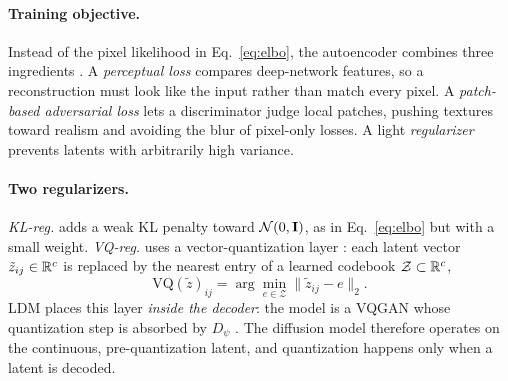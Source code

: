 \paragraph{Training objective.} Instead of the pixel likelihood in
Eq.~\eqref{eq:elbo}, the autoencoder combines three ingredients
\cite[Sec.~3.1]{rombach2022ldm}. A \emph{perceptual loss}
\cite{zhang2018lpips} compares deep-network features, so a reconstruction
must look like the input rather than match every pixel. A
\emph{patch-based adversarial loss} \cite{isola2017pix2pix,esser2021vqgan}
lets a discriminator judge local patches, pushing textures toward realism
and avoiding the blur of pixel-only losses. A light \emph{regularizer}
prevents latents with arbitrarily high variance.

\paragraph{Two regularizers.} \emph{KL-reg.} adds a weak KL penalty toward
$\mathcal{N}(0,\mathbf{I})$, as in Eq.~\eqref{eq:elbo} but with a small weight.
\emph{VQ-reg.} uses a vector-quantization layer \cite{oord2017vqvae}: each
latent vector $\tilde z_{ij}\in\mathbb{R}^c$ is replaced by the nearest entry of a
learned codebook $\mathcal Z\subset\mathbb{R}^c$,
\begin{equation}
\mathrm{VQ}(\tilde z)_{ij}=\arg\min_{e\in\mathcal Z}\|\tilde z_{ij}-e\|_2.
\label{eq:vq}
\end{equation}
LDM places this layer \emph{inside the decoder}: the model is a VQGAN
\cite{esser2021vqgan} whose quantization step is absorbed by $D_\psi$
\cite[Sec.~3.1]{rombach2022ldm}. The diffusion model therefore operates
on the continuous, pre-quantization latent, and quantization happens
only when a latent is decoded.

